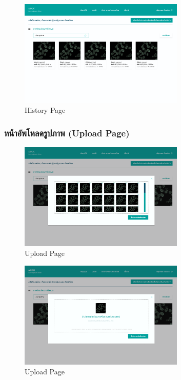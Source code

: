 \begin{figure}[h]
    \begin{center}
        \includegraphics[width=0.7\textwidth]{img/user/3-histort-page.png}
    \end{center}
    \caption[Poem]{History Page}
    \label{fig:history_2}
\end{figure}

\newpage
\subsubsection{หน้าอัพโหลดรูปภาพ (Upload Page)}
\begin{figure}[h]
    \begin{center}
        \includegraphics[width=0.7\textwidth]{img/user/4-1-upload-image-pop-up.png}
    \end{center}
    \caption[Poem]{Upload Page}
    \label{fig:upload}
\end{figure}

\begin{figure}[h]
    \begin{center}
        \includegraphics[width=0.7\textwidth]{img/user/4-upload-image-pop-up.png}
    \end{center}
    \caption[Poem]{Upload Page}
    \label{fig:upload_2}
\end{figure}

